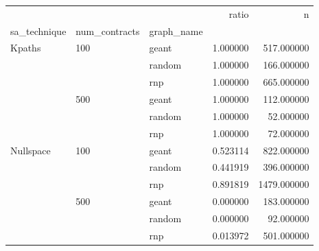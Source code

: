 \begin{tabular}{lllrr}
\toprule
 &  &  & ratio & n \\
sa_technique & num_contracts & graph_name &  &  \\
\midrule
\multirow[t]{6}{*}{Kpaths} & \multirow[t]{3}{*}{100} & geant & 1.000000 & 517.000000 \\
 &  & random & 1.000000 & 166.000000 \\
 &  & rnp & 1.000000 & 665.000000 \\
\cline{2-5}
 & \multirow[t]{3}{*}{500} & geant & 1.000000 & 112.000000 \\
 &  & random & 1.000000 & 52.000000 \\
 &  & rnp & 1.000000 & 72.000000 \\
\cline{1-5} \cline{2-5}
\multirow[t]{6}{*}{Nullspace} & \multirow[t]{3}{*}{100} & geant & 0.523114 & 822.000000 \\
 &  & random & 0.441919 & 396.000000 \\
 &  & rnp & 0.891819 & 1479.000000 \\
\cline{2-5}
 & \multirow[t]{3}{*}{500} & geant & 0.000000 & 183.000000 \\
 &  & random & 0.000000 & 92.000000 \\
 &  & rnp & 0.013972 & 501.000000 \\
\cline{1-5} \cline{2-5}
\bottomrule
\end{tabular}
